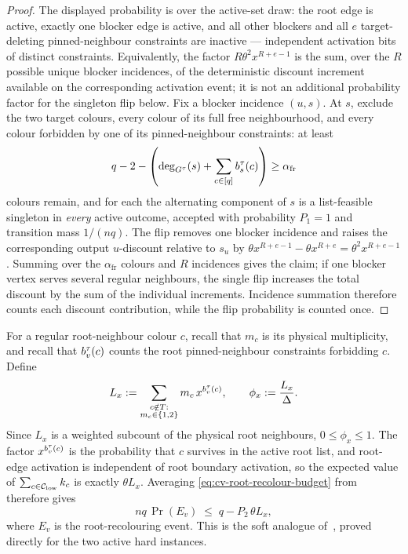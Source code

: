 \begin{proof}
The displayed probability is over the active-set draw: the root edge is
active, exactly one blocker edge is active, and all other blockers and all
\(e\) target-deleting pinned-neighbour constraints are inactive --- independent activation bits
of distinct constraints.  Equivalently, the factor
\(R\theta^2x^{R+e-1}\) is the sum, over the \(R\) possible unique blocker
incidences, of the deterministic discount increment available on the
corresponding activation event; it is not an additional probability factor
for the singleton flip below.  Fix a blocker incidence $(u,s)$. At $s$, exclude the
two target colours, every colour of
its full free neighbourhood, and every colour forbidden by one of its
pinned-neighbour constraints: at least
\[
  q-2-\left(\deg_{G^\tau}(s)+\sum_{c\in[q]}b_s^\tau(c)\right)
  \ge\alpha_{\mathrm{fr}}
\]
colours remain, and for each the alternating component of $s$ is a list-feasible
singleton in \emph{every} active outcome, accepted with probability $P_1=1$
and transition mass $1/(nq)$. The flip removes one blocker incidence and raises the
corresponding output $u$-discount relative to $s_u$ by
$\theta x^{R+e-1}-\theta x^{R+e}=\theta^2x^{R+e-1}$. Summing over
the $\alpha_{\mathrm{fr}}$ colours and $R$ incidences gives the claim; if one blocker
vertex serves several regular neighbours, the single flip increases the total
discount by the sum of the individual increments. Incidence summation
therefore counts each discount contribution, while the flip probability
is counted once.
\end{proof}

For a regular root-neighbour colour \(c\), recall that \(m_c\) is its
physical multiplicity, and recall that \(b_v^\tau(c)\) counts the root
pinned-neighbour constraints forbidding \(c\). Define
\begin{equation}\label{eq:cv-Lx}
  L_x:=\sum_{\substack{c\notin T:\\m_c\in\left\{1,2\right\}}}
      m_c\,x^{b_v^\tau(c)},\qquad
  \phi_x:=\frac{L_x}{\Delta} .
\end{equation}
Since $L_x$ is a weighted subcount of the physical root neighbours,
$0\le \phi_x\le1$.
The factor $x^{b_v^\tau(c)}$ is the probability that $c$ survives in the
active root list, and root-edge activation is independent of root boundary
activation, so the expected value of
$\sum_{c\in\mathcal C_{\rm low}}k_c$ is exactly $\theta L_x$.
Averaging \eqref{eq:cv-root-recolour-budget} from
 therefore gives
\begin{equation}\label{eq:cv-root-event}
  nq\,\Pr(E_v)\;\le\;q-P_2\,\theta L_x ,
\end{equation}
where $E_v$ is the root-recolouring event. This is the soft analogue
of~\cite[Eq.~(18)]{CarlsonVigoda2024}, proved directly for the two active
hard instances.

